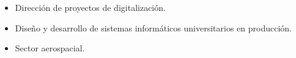 \begin{itemize}
\item Dirección de proyectos de digitalización.
\item Diseño y desarrollo de sistemas informáticos universitarios en producción.
\end{itemize}
\divider

\begin{itemize}
\item Sector aerospacial.
\end{itemize}
\divider

\clearpage